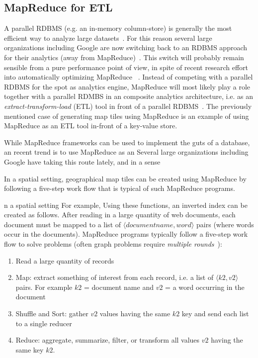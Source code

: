 \documentclass[11pt, oneside]{report}   	%
\begin{document}
\subsection{MapReduce for ETL}

A parallel RDBMS (e.g. an in-memory column-store) is generally the most efficient way to analyze large datasets~\cite{pavlo2009comparison}. For this reason several large organizations including Google are now switching back to an RDBMS approach for their analytics (away from MapReduce)~\cite{melnik2011dremel}. This switch will probably remain sensible from a pure performance point of view, in spite of recent research effort into automatically optimizing MapReduce ~\cite{jahani2011mapreduceoptimization,floratou2011columnmapreduce}. Instead of competing with a parallel RDBMS for the spot as analytics engine, MapReduce will most likely play a role together with a parallel RDMBS in an composite analytics architecture, i.e. as an \emph{extract-transform-load} (ETL) tool in front of a parallel RDBMS~\cite{stonebraker2010friendsorfoes}. The previously mentioned case of generating map tiles using MapReduce is an example of using MapReduce as an ETL tool in-front of a key-value store.


While MapReduce frameworks can be used to implement the guts of a database, an recent trend is to use MapReduce as an  Several large organizations including Google have taking this route lately, and in a sense 


In a spatial setting, geographical map tiles can be created using MapReduce by following a five-step work flow that is typical of such MapReduce programs. 

n a spatial setting For example, Using these functions, an inverted index can be created as follows. After reading in a large quantity of web documents, each document must be mapped to a list of $\langle document name, word \rangle$ pairs (where words occur in the documents). 
MapReduce programs typically follow a five-step work flow to solve problems (often graph problems require \emph{multiple rounds}~\cite{ekanayake2010itermapreduce,myung2010sparqlmapreduce}):

\begin{enumerate}
\item Read a large quantity of records
\item Map: extract something of interest from each record, i.e. a list of $\langle k2, v2 \rangle$ pairs. For example $k2$ = document name and $v2$ = a word occurring in the document
\item Shuffle and Sort: gather $v2$ values having the same $k2$ key and send each list to a single reducer 
\item Reduce: aggregate, summarize, filter, or transform all values $v2$ having the same key $k2$.
\end{enumerate}
\end{document}
